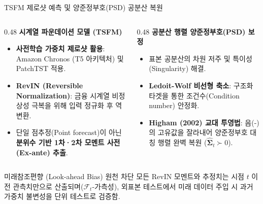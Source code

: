 \begin{frame}{TSFM 제로샷 예측 및 양준정부호(PSD) 공분산 복원}
\begin{columns}[T]
  \begin{column}{0.48\textwidth}
    \textbf{시계열 파운데이션 모델 (TSFM)}
    \begin{itemize}
      \setlength{\itemsep}{4pt}
      \small
      \item \textbf{사전학습 가중치 제로샷 활용}:
      Amazon Chronos (T5 아키텍처) 및 PatchTST 적용.
      \item \textbf{RevIN (Reversible Normalization)}:
      금융 시계열 비정상성 극복을 위해 입력 정규화 후 역변환.
      \item 단일 점추정(Point forecast)이 아닌 \textbf{분위수 기반 1차·2차 모멘트 사전(Ex-ante) 추출}.
    \end{itemize}
  \end{column}
  
  \begin{column}{0.48\textwidth}
    \textbf{공분산 행렬 양준정부호(PSD) 보정}
    \begin{itemize}
      \setlength{\itemsep}{4pt}
      \small
      \item 표본 공분산의 차원 저주 및 특이성(Singularity) 해결.
      \item \textbf{Ledoit-Wolf 비선형 축소}:
      구조화 타겟을 통한 조건수(Condition number) 안정화.
      \item \textbf{Higham (2002) 교대 투영법}:
      음(-)의 고유값을 잘라내어 양준정부호 대칭 행렬 완벽 복원 ($\hat{\boldsymbol{\Sigma}}_t \succ 0$).
    \end{itemize}
  \end{column}
\end{columns}

\vspace{3mm}
\begin{block}{미래참조편향 (Look-ahead Bias) 원천 차단}
  \small 모든 RevIN 모멘트와 추정치는 시점 $t$ 이전 관측치만으로 산출되며($\mathcal{F}_t$-가측성), 외표본 테스트에서 미래 데이터 주입 시 과거 가중치 불변성을 단위 테스트로 검증함.
\end{block}
\end{frame}

